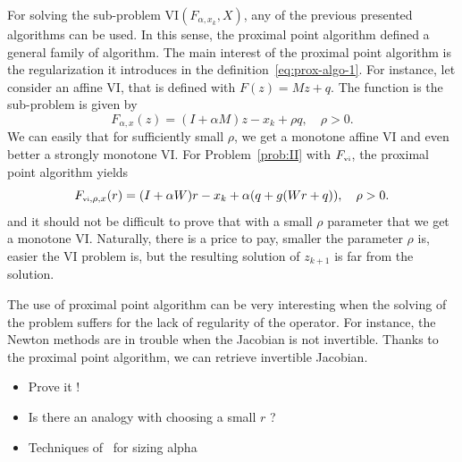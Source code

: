 For solving the sub-problem $\mathrm{VI}(F_{\alpha,x_k},X)$, any of the previous presented algorithms can be used. In this sense, the proximal point algorithm defined a general family of algorithm. The main interest of the proximal point algorithm is the regularization it introduces in the  definition~\eqref{eq:prox-algo-1}. For instance, let consider an affine VI, that is defined with $F(z)=M z+q$. The function is the sub-problem is given by
\begin{equation}
  \label{eq:prox-algo-4}
   F_{\alpha,x}(z) = (I + \alpha M) z - x_k + \rho q , \quad \rho > 0 .
\end{equation}
We can easily that for sufficiently small $\rho$, we get a monotone affine VI and even better a strongly monotone VI. For Problem~\ref{prob:II} with $F_{{\hbox{\tiny{vi}}}}$, the proximal point algorithm yields
\begin{equation}
  \label{eq:prox-algo-5}
   F_{\vitwo,\rho,x}(r) = (I + \alpha W) r - x_k + \alpha( q + g(W r +q )) , \quad \rho > 0 .
\end{equation}
and it should not be difficult to prove that with a small $\rho$ parameter that we get a monotone VI.  Naturally, there is a price to pay, smaller the parameter $\rho$ is, easier the VI problem is, but the resulting solution of $z_{k+1}$ is far from the solution.

The use of proximal point algorithm can be very interesting when the solving of the problem suffers for the lack of regularity of the operator. For instance, the Newton methods are in trouble when the Jacobian is not invertible. Thanks to the proximal point algorithm, we can retrieve invertible Jacobian.


\begin{ndrva}
  \begin{itemize}
  \item Prove it !
  \item Is there an analogy with choosing a small $r$ ?
  \item Techniques of~\citep{Han_JCAM2008} for sizing alpha
  \end{itemize}
\end{ndrva}

